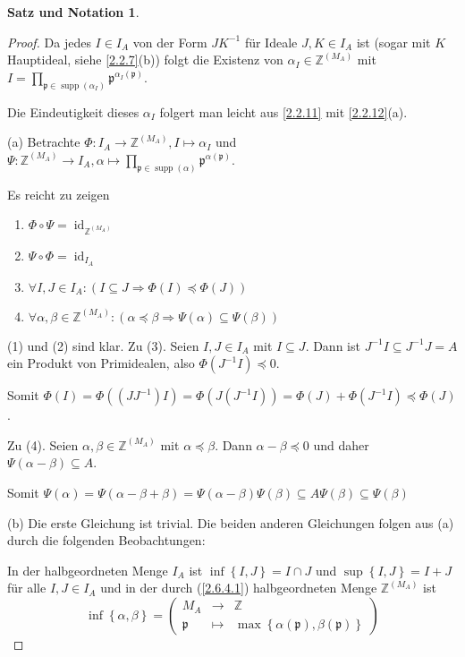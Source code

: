 \documentclass[
twoside=semi,
fontsize=12,
DIV=12, 
cleardoublepage=current,
leqno,
headings=optiontoheadandtoc, 
toc=idx
]{scrbook}
\newcommand{\Z}{\mathbb{Z}}
\newcommand{\set}[1]{\left\{ #1 \right\}}
\DeclareMathOperator{\supp}{supp}
\DeclareMathOperator{\id}{id}
\theoremstyle{definition}
\newtheorem{satz-not}[definition]{Satz und Notation}
\begin{document}
\begin{satz-not}
\begin{proof}
 			Da jedes $I \in I_A$ von der Form $JK^{-1}$ f\"ur Ideale $J,K \in I_A$ ist (sogar mit $K$ Hauptideal, siehe \ref{2.2.7}(b)) folgt die Existenz von $\alpha_I \in \Z^{(M_A)}$ mit $I = \prod_{\mathfrak{p} \in \supp(\alpha_I)} \mathfrak{p}^{\alpha_I(\mathfrak{p})}$.
 			
 			Die Eindeutigkeit dieses $\alpha_I$ folgert man leicht aus \ref{2.2.11} mit \ref{2.2.12}(a).
 			
 			(a) Betrachte $\Phi: I_A \to \Z^{(M_A)}, I \mapsto \alpha_I$ und $\Psi: \Z^{(M_A)} \to I_A, \alpha \mapsto \prod_{\mathfrak{p} \in \supp(\alpha)} \mathfrak{p}^{\alpha(\mathfrak{p})}$.
 			
 			Es reicht zu zeigen 
 			\begin{enumerate}[(1)]
 				\item $\Phi \circ \Psi = \id_{\Z^{(M_A)}}$
 				\item $\Psi \circ \Phi = \id_{I_A}$
 				\item $\forall I, J \in I_A: (I \subseteq J \Longrightarrow \Phi(I) \preceq \Phi(J))$
 				\item $\forall \alpha, \beta \in \Z^{(M_A)}: ( \alpha \preceq \beta \Longrightarrow \Psi(\alpha) \subseteq \Psi(\beta))$
 			\end{enumerate}
 		
 			(1) und (2) sind klar. Zu (3). Seien $I, J \in I_A$ mit $I \subseteq J$. Dann ist $J^{-1}I \subseteq J^{-1}J = A$ ein Produkt von Primidealen, also $\Phi(J^{-1}I) \preceq 0$. 
 			
 			Somit $\Phi(I) = \Phi((JJ^{-1})I) = \Phi(J(J^{-1}I)) = \Phi(J) + \Phi(J^{-1}I) \preceq \Phi(J)$.
 			
 			Zu (4). Seien $\alpha, \beta \in \Z^{(M_A)}$ mit $\alpha \preceq \beta$. Dann $\alpha - \beta \preceq 0$ und daher $\Psi(\alpha - \beta ) \subseteq A$.
 			
 			Somit $\Psi(\alpha) = \Psi(\alpha-\beta + \beta) = \Psi(\alpha-\beta)\Psi(\beta) \subseteq A\Psi(\beta) \subseteq \Psi(\beta)$
 			
 			(b) Die erste Gleichung ist trivial. Die beiden anderen Gleichungen folgen aus (a) durch die folgenden Beobachtungen:
 			
 			In der halbgeordneten Menge $I_A$ ist $\inf \set{I, J} = I \cap J$ und $\sup \set{I, J} = I + J$ f\"ur alle $I, J \in I_A$ und in der durch (\ref{2.6.4.1}) halbgeordneten Menge
 			$\Z^{(M_A)}$ ist \[\inf \set{\alpha, \beta} = \begin{pmatrix}
 					M_A &\to& \Z\\
 					\mathfrak{p} &\mapsto& \max \set{\alpha(\mathfrak{p}), \beta(\mathfrak{p})}
 			\end{pmatrix}\]
 		

\end{proof}
\end{satz-not}
\end{document}
